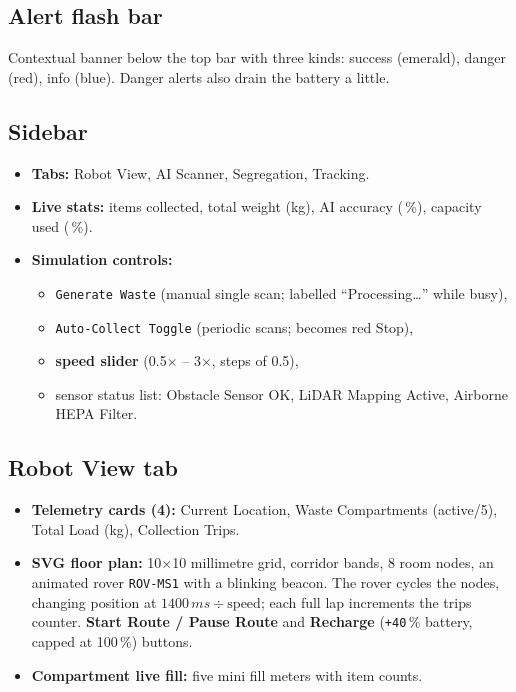 \documentclass[11pt, a4paper]{article}
\begin{document}
\subsection{Alert flash bar}
Contextual banner below the top bar with three kinds: success (emerald),
danger (red), info (blue). Danger alerts also drain the battery a little.

\subsection{Sidebar}
\begin{itemize}[leftmargin=1.6em, itemsep=2pt]
  \item \textbf{Tabs:} Robot View, AI Scanner, Segregation, Tracking.
  \item \textbf{Live stats:} items collected, total weight (kg), AI accuracy
        (\,\%), capacity used (\,\%).
  \item \textbf{Simulation controls:}
    \begin{itemize}[leftmargin=1.6em, itemsep=2pt]
      \item \texttt{Generate Waste} (manual single scan; labelled
            ``Processing\ldots'' while busy),
      \item \texttt{Auto-Collect Toggle} (periodic scans; becomes red Stop),
      \item \textbf{speed slider} (0.5$\times$ -- 3$\times$, steps of 0.5),
      \item sensor status list: Obstacle Sensor OK, LiDAR Mapping Active,
            Airborne HEPA Filter.
    \end{itemize}
\end{itemize}

\subsection{Robot View tab}
\begin{itemize}[leftmargin=1.6em, itemsep=2pt]
  \item \textbf{Telemetry cards (4):} Current Location, Waste Compartments
        (active/5), Total Load (kg), Collection Trips.
  \item \textbf{SVG floor plan:} 10$\times$10 millimetre grid, corridor bands,
        8 room nodes, an animated rover \texttt{ROV-MS1} with a blinking beacon.
        The rover cycles the nodes, changing position at
        $1400\,ms \div \text{speed}$; each full lap increments the trips counter.
      \textbf{Start Route / Pause Route} and \textbf{Recharge} (\texttt{+40}\,\%
        battery, capped at 100\,\%) buttons.
  \item \textbf{Compartment live fill:} five mini fill meters with item counts.
\end{itemize}
\end{document}
